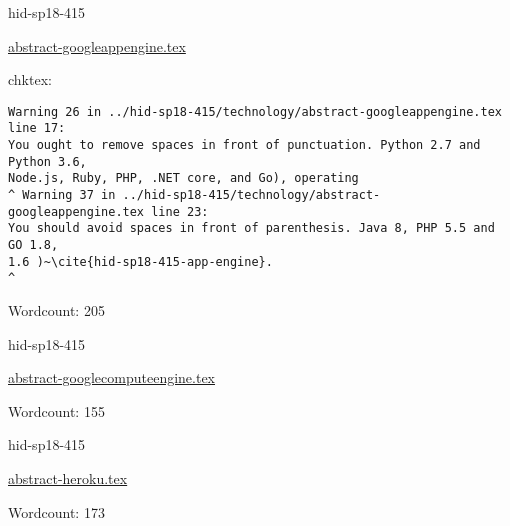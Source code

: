 \begin{IU}

hid-sp18-415

\href{https://github.com/cloudmesh-community/hid-sp18-415/blob/master//technology/abstract-googleappengine.tex}{abstract-googleappengine.tex}

 
chktex:
\begin{tiny}
\begin{verbatim}
Warning 26 in ../hid-sp18-415/technology/abstract-googleappengine.tex line 17:
You ought to remove spaces in front of punctuation. Python 2.7 and Python 3.6,
Node.js, Ruby, PHP, .NET core, and Go), operating
^ Warning 37 in ../hid-sp18-415/technology/abstract-googleappengine.tex line 23:
You should avoid spaces in front of parenthesis. Java 8, PHP 5.5 and GO 1.8,
1.6 )~\cite{hid-sp18-415-app-engine}.                                     ^
\end{verbatim}
\end{tiny}

Wordcount: 205

\end{IU}



\begin{IU}

hid-sp18-415

\href{https://github.com/cloudmesh-community/hid-sp18-415/blob/master//technology/abstract-googlecomputeengine.tex}{abstract-googlecomputeengine.tex}

 

Wordcount: 155

\end{IU}



\begin{IU}

hid-sp18-415

\href{https://github.com/cloudmesh-community/hid-sp18-415/blob/master//technology/abstract-heroku.tex}{abstract-heroku.tex}

 

Wordcount: 173

\end{IU}



